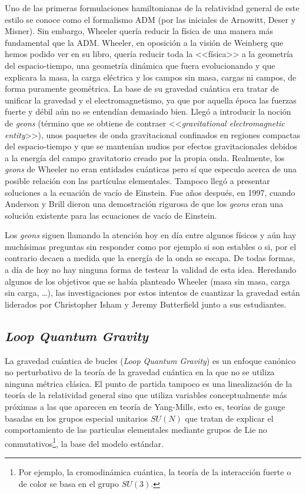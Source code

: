 \documentclass[11pt,a4paper,titlepage]{article}
\begin{document}
Uno de las primeras formulaciones hamiltonianas de la relatividad general de este estilo se conoce como el formalismo ADM (por las iniciales de Arnowitt, Deser y Misner). Sin embargo, Wheeler quería reducir la física de una manera más fundamental que la ADM. Wheeler, en oposición a la visión de Weinberg que hemos podido ver en su libro, quería reducir toda la <<física>> a la geometría del espacio-tiempo, una geometría dinámica que fuera evolucionando y que explicara la masa, la carga eléctrica y los campos sin masa, cargas ni campos, de forma puramente geométrica. La base de su gravedad cuántica era tratar de unificar la gravedad y el electromagnetismo, ya que por aquella época las fuerzas fuerte y débil aún no se entendían demasiado bien. Llegó a introducir la noción de \emph{geons} (término que se obtiene de contraer <<\emph{gravitational electromagnetic entity}>>), unos paquetes de onda gravitacional confinados en regiones compactas del espacio-tiempo y que se mantenían nudios por efectos gravitacionales debidos a la energía del campo gravitatorio creado por la propia onda. Realmente, los \emph{geons} de Wheeler no eran entidades cuánticas pero sí que especulo acerca de una posible relación con las partículas elementales. Tampoco llegó a presentar soluciones a la ecuación de vacío de Einstein. Fue años después, en 1997, cuando Anderson y Brill \cite{geons} dieron una demostración rigurosa de que los \emph{geons} eran una solución existente para las ecuaciones de vacío de Einstein.

Los \emph{geons} siguen llamando la atención hoy en día entre algunos físicos y aún hay muchísimas preguntas sin responder como por ejemplo si son estables o si, por el contrario decaen a medida que la energía de la onda se escapa. De todas formas, a día de hoy no hay ninguna forma de testear la validad de esta idea. Heredando algunos de los objetivos que se había planteado Wheeler (masa sin masa, carga sin carga, \dots), las investigaciones por estos intentos de cuantizar la gravedad están liderados por Christopher Isham y Jeremy Butterfield junto a sus estudiantes.

\subsection{\textit{Loop Quantum Gravity}}

La gravedad cuántica de bucles (\textit{Loop Quantum Gravity}) es un enfoque canónico no perturbativo de la teoría de la gravedad cuántica en la que no se utiliza ninguna métrica clásica. El punto de partida tampoco es una linealización de la teoría de la relatividad general sino que utiliza variables conceptualmente más próximas a las que aparecen en teoría de Yang-Mills, esto es, teorías de gauge basadas en los grupos especial unitarios $SU(N)$ que tratan de explicar el comportamiento de las particulas elementales mediante grupos de Lie no conmutativos\footnote{Por ejemplo, la cromodinámica cuántica, la teoría de la interacción fuerte o de color se basa en el grupo $SU(3)$.}, la base del modelo estándar.
\end{document}
